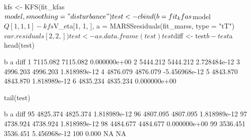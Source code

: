 \begin{Schunk}
\begin{Sinput}
 kfs <- KFS(fit_kfas$model, smoothing = "disturbance")
 test <- cbind(
   b = fit_kfas$model$Q[1, 1, 1] - kfs$V_eta[1, 1, ],
   a = MARSSresiduals(fit_marss, type = "tT")$var.residuals[2, 2, ]
 )
 test <- as.data.frame(test)
 test$diff <- test$b - test$a
 head(test)
\end{Sinput}
\begin{Soutput}
         b        a          diff
1 7115.082 7115.082  0.000000e+00
2 5444.212 5444.212  2.728484e-12
3 4996.203 4996.203  1.818989e-12
4 4876.079 4876.079 -5.456968e-12
5 4843.870 4843.870  1.818989e-12
6 4835.234 4835.234  0.000000e+00
\end{Soutput}
\begin{Sinput}
 tail(test)
\end{Sinput}
\begin{Soutput}
           b        a         diff
95  4825.374 4825.374 1.818989e-12
96  4807.095 4807.095 1.818989e-12
97  4738.924 4738.924 1.818989e-12
98  4484.677 4484.677 0.000000e+00
99  3536.451 3536.451 5.456968e-12
100    0.000       NA           NA
\end{Soutput}
\end{Schunk}
